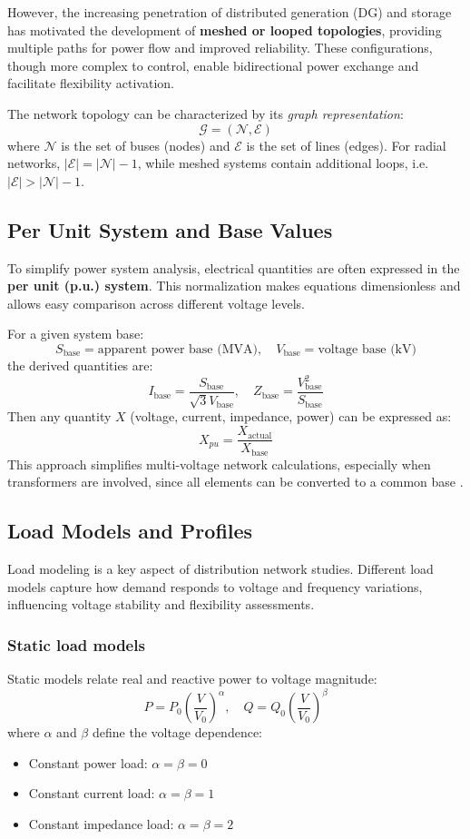 \documentclass[11pt]{article}
\begin{document}
	However, the increasing penetration of distributed generation (DG) and storage has motivated the development of \textbf{meshed or looped topologies}, providing multiple paths for power flow and improved reliability.  
	These configurations, though more complex to control, enable bidirectional power exchange and facilitate flexibility activation.
	
	The network topology can be characterized by its \textit{graph representation}:
	\[
	\mathcal{G} = (\mathcal{N}, \mathcal{E})
	\]
	where $\mathcal{N}$ is the set of buses (nodes) and $\mathcal{E}$ is the set of lines (edges).  
	For radial networks, $|\mathcal{E}| = |\mathcal{N}| - 1$, while meshed systems contain additional loops, i.e. $|\mathcal{E}| > |\mathcal{N}| - 1$.
	
	\subsection{Per Unit System and Base Values}
	
	To simplify power system analysis, electrical quantities are often expressed in the \textbf{per unit (p.u.) system}.  
	This normalization makes equations dimensionless and allows easy comparison across different voltage levels.
	
	For a given system base:
	\[
	S_\text{base} = \text{apparent power base (MVA)}, \quad V_\text{base} = \text{voltage base (kV)}
	\]
	the derived quantities are:
	\[
	I_\text{base} = \frac{S_\text{base}}{\sqrt{3}V_\text{base}}, \quad Z_\text{base} = \frac{V_\text{base}^2}{S_\text{base}}
	\]
	Then any quantity $X$ (voltage, current, impedance, power) can be expressed as:
	\[
	X_{pu} = \frac{X_\text{actual}}{X_\text{base}}
	\]
	This approach simplifies multi-voltage network calculations, especially when transformers are involved, since all elements can be converted to a common base \cite{kundur1994power,grainger1994power}.
	
	\subsection{Load Models and Profiles}
	
	Load modeling is a key aspect of distribution network studies.  
	Different load models capture how demand responds to voltage and frequency variations, influencing voltage stability and flexibility assessments.
	
	\subsubsection*{Static load models}
	Static models relate real and reactive power to voltage magnitude:
	\[
	P = P_0 \left( \frac{V}{V_0} \right)^{\alpha}, \quad Q = Q_0 \left( \frac{V}{V_0} \right)^{\beta}
	\]
	where $\alpha$ and $\beta$ define the voltage dependence:
	\begin{itemize}
		\item Constant power load: $\alpha = \beta = 0$
		\item Constant current load: $\alpha = \beta = 1$
		\item Constant impedance load: $\alpha = \beta = 2$
	\end{itemize}
	
\end{document}
